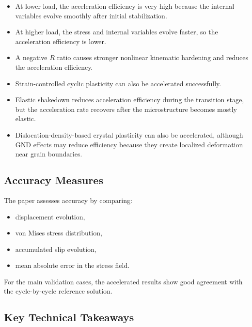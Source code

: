 ﻿\documentclass[11pt,a4paper]{article}
\begin{document}
\begin{itemize}[leftmargin=*]
    \item At lower load, the acceleration efficiency is very high because the internal variables evolve smoothly after initial stabilization.
    \item At higher load, the stress and internal variables evolve faster, so the acceleration efficiency is lower.
    \item A negative $R$ ratio causes stronger nonlinear kinematic hardening and reduces the acceleration efficiency.
    \item Strain-controlled cyclic plasticity can also be accelerated successfully.
    \item Elastic shakedown reduces acceleration efficiency during the transition stage, but the acceleration rate recovers after the microstructure becomes mostly elastic.
    \item Dislocation-density-based crystal plasticity can also be accelerated, although GND effects may reduce efficiency because they create localized deformation near grain boundaries.
\end{itemize}

\subsection{Accuracy Measures}

The paper assesses accuracy by comparing:

\begin{itemize}[leftmargin=*]
    \item displacement evolution,
    \item von Mises stress distribution,
    \item accumulated slip evolution,
    \item mean absolute error in the stress field.
\end{itemize}

For the main validation cases, the accelerated results show good agreement with the cycle-by-cycle reference solution.

\subsection{Key Technical Takeaways}
\end{document}
